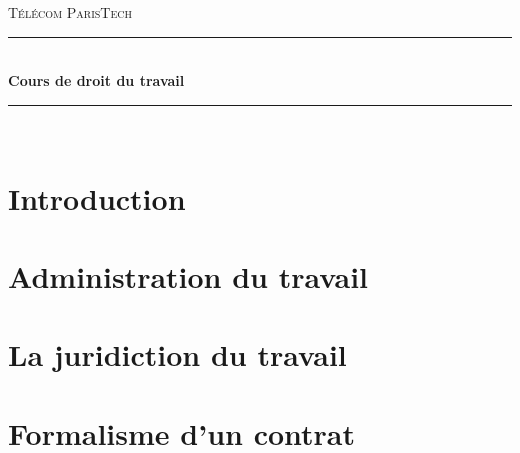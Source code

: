 \documentclass[a4paper,11pt]{article}
\theoremstyle{remark}
\begin{document}
\renewcommand{\contentsname}{Sommaire}
\setcounter{tocdepth}{1}



\begin{titlepage}
	\newcommand{\HRule}{\rule{\linewidth}{0.5mm}}

	\center

	\textsc{\LARGE Télécom ParisTech}\\[1.2cm]

	\HRule \\[0.8cm]
	{ \huge \bfseries Cours de droit du travail}\\[0.4cm]
	\HRule \\[1.4cm]
	
	\tableofcontents


\end{titlepage}

\section{Introduction}
	

\section{Administration du travail}
	

\section{La juridiction du travail}
	

\section{Formalisme d'un contrat}
\end{document}
